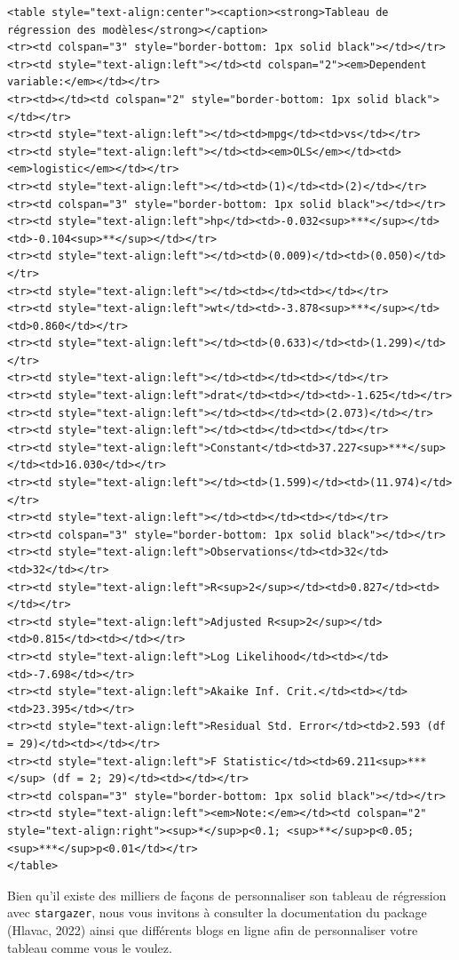 \documentclass[
  letterpaper,
  DIV=11,
  numbers=noendperiod]{scrreprt}
\begin{document}
\begin{verbatim}
<table style="text-align:center"><caption><strong>Tableau de régression des modèles</strong></caption>
<tr><td colspan="3" style="border-bottom: 1px solid black"></td></tr><tr><td style="text-align:left"></td><td colspan="2"><em>Dependent variable:</em></td></tr>
<tr><td></td><td colspan="2" style="border-bottom: 1px solid black"></td></tr>
<tr><td style="text-align:left"></td><td>mpg</td><td>vs</td></tr>
<tr><td style="text-align:left"></td><td><em>OLS</em></td><td><em>logistic</em></td></tr>
<tr><td style="text-align:left"></td><td>(1)</td><td>(2)</td></tr>
<tr><td colspan="3" style="border-bottom: 1px solid black"></td></tr><tr><td style="text-align:left">hp</td><td>-0.032<sup>***</sup></td><td>-0.104<sup>**</sup></td></tr>
<tr><td style="text-align:left"></td><td>(0.009)</td><td>(0.050)</td></tr>
<tr><td style="text-align:left"></td><td></td><td></td></tr>
<tr><td style="text-align:left">wt</td><td>-3.878<sup>***</sup></td><td>0.860</td></tr>
<tr><td style="text-align:left"></td><td>(0.633)</td><td>(1.299)</td></tr>
<tr><td style="text-align:left"></td><td></td><td></td></tr>
<tr><td style="text-align:left">drat</td><td></td><td>-1.625</td></tr>
<tr><td style="text-align:left"></td><td></td><td>(2.073)</td></tr>
<tr><td style="text-align:left"></td><td></td><td></td></tr>
<tr><td style="text-align:left">Constant</td><td>37.227<sup>***</sup></td><td>16.030</td></tr>
<tr><td style="text-align:left"></td><td>(1.599)</td><td>(11.974)</td></tr>
<tr><td style="text-align:left"></td><td></td><td></td></tr>
<tr><td colspan="3" style="border-bottom: 1px solid black"></td></tr><tr><td style="text-align:left">Observations</td><td>32</td><td>32</td></tr>
<tr><td style="text-align:left">R<sup>2</sup></td><td>0.827</td><td></td></tr>
<tr><td style="text-align:left">Adjusted R<sup>2</sup></td><td>0.815</td><td></td></tr>
<tr><td style="text-align:left">Log Likelihood</td><td></td><td>-7.698</td></tr>
<tr><td style="text-align:left">Akaike Inf. Crit.</td><td></td><td>23.395</td></tr>
<tr><td style="text-align:left">Residual Std. Error</td><td>2.593 (df = 29)</td><td></td></tr>
<tr><td style="text-align:left">F Statistic</td><td>69.211<sup>***</sup> (df = 2; 29)</td><td></td></tr>
<tr><td colspan="3" style="border-bottom: 1px solid black"></td></tr><tr><td style="text-align:left"><em>Note:</em></td><td colspan="2" style="text-align:right"><sup>*</sup>p<0.1; <sup>**</sup>p<0.05; <sup>***</sup>p<0.01</td></tr>
</table>
\end{verbatim}

Bien qu'il existe des milliers de façons de personnaliser son tableau de
régression avec \texttt{stargazer}, nous vous invitons à consulter la
documentation du package (Hlavac, 2022) ainsi que différents blogs en
ligne afin de personnaliser votre tableau comme vous le voulez.
\end{document}
